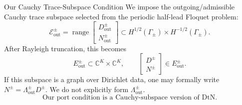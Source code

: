 \documentclass[aspectratio=169]{beamer}
\begin{document}
\begin{frame}{Our Cauchy Trace-Subspace Condition}
  \small
  We impose the outgoing/admissible Cauchy trace subspace selected from the
  periodic half-lead Floquet problem:
  \[
    \mathcal E_{\mathrm{out}}^\pm
    =
    \operatorname{range}
    \begin{bmatrix}
      D_{\mathrm{out}}^\pm\\
      N_{\mathrm{out}}^\pm
    \end{bmatrix}
    \subset
    H^{1/2}(\Gamma_\pm)\times H^{-1/2}(\Gamma_\pm).
  \]
  After Rayleigh truncation, this becomes
  \[
    E_{\mathrm{out}}^\pm
    \subset
    \mathbb C^K\times\mathbb C^K,
    \qquad
    \begin{bmatrix}D^\pm\\N^\pm\end{bmatrix}\in E_{\mathrm{out}}^\pm.
  \]
  If this subspace is a graph over Dirichlet data, one may formally write
  \(N^\pm=\Lambda_{\mathrm{out}}^\pm D^\pm\). We do not explicitly form
  \(\Lambda_{\mathrm{out}}^\pm\).
  \[
    \boxed{\text{Our port condition is a Cauchy-subspace version of DtN.}}
  \]
\end{frame}
\end{document}

